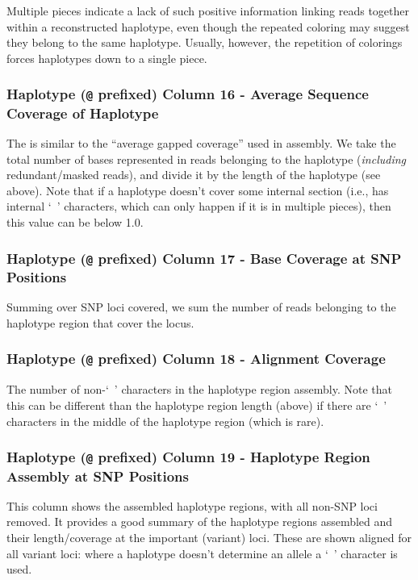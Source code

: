 \documentclass[11pt]{llncs}
\begin{document}
Multiple pieces indicate a lack of such positive information linking reads together within a reconstructed haplotype, even though the
repeated coloring may suggest they belong to the same haplotype.  Usually, however, the repetition
of colorings forces haplotypes down to a single piece.

\subsubsection{Haplotype (\texttt{@} prefixed) Column 16 - Average Sequence Coverage of Haplotype}

The is similar to the ``average gapped coverage'' used in assembly. We take the total number of bases represented in reads belonging to the haplotype
(\emph{including} redundant/masked reads), and divide it by the length of the haplotype (see above). Note that if a haplotype doesn't cover some
internal section (i.e., has internal `~' characters, which can only happen if it is in multiple pieces), then this value can be below 1.0.

\subsubsection{Haplotype (\texttt{@} prefixed) Column 17 - Base Coverage at SNP Positions}

Summing over SNP loci covered, we sum the number of reads belonging to the haplotype region that cover the locus. 

\subsubsection{Haplotype (\texttt{@} prefixed) Column 18 - Alignment Coverage}

The number of non-`~' characters in the haplotype region assembly. Note that this can be different than the haplotype region length (above) if
there are `~' characters in the middle of the haplotype region (which is rare).




\subsubsection{Haplotype (\texttt{@} prefixed) Column 19 - Haplotype Region Assembly at SNP Positions}

This column shows the assembled haplotype regions, with all non-SNP loci removed. It provides a good summary of the haplotype regions assembled and their
length/coverage at the important (variant) loci. These are shown aligned for all variant loci: where a haplotype doesn't determine an allele
a `~' character is used.
\end{document}
